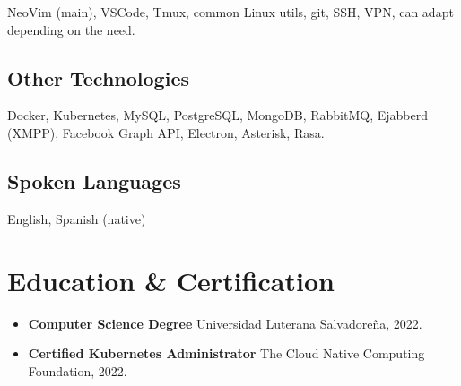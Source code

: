 \documentclass[letterpaper]{article}
\begin{document}
NeoVim (main), VSCode, Tmux, common Linux utils, git, SSH, VPN, can adapt depending on the need.

\subsection{Other Technologies}

Docker, Kubernetes, MySQL, PostgreSQL, MongoDB, RabbitMQ, Ejabberd (XMPP), Facebook Graph API, Electron, Asterisk, Rasa.

\subsection{Spoken Languages}

English, Spanish (native)

\section{Education \& Certification}

\begin{itemize}
	\item \textbf{Computer Science Degree} \newline Universidad Luterana Salvadoreña, 2022.

	\item \textbf{Certified Kubernetes Administrator} \newline The Cloud Native Computing Foundation, 2022.
\end{itemize}
\end{document}

